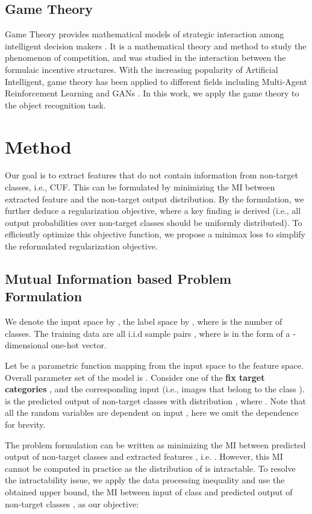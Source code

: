 \documentclass{article}
\theoremstyle{definition}
\begin{document}
\subsection{Game Theory}
Game Theory provides mathematical models of strategic interaction among intelligent decision makers \cite{myerson1991game}. It is a mathematical theory and method to study the phenomenon of competition, and was studied in \cite{osborne2004introduction} the interaction between the formulaic incentive structures. With the increasing popularity of Artificial Intelligent, game theory has been applied to different fields including Multi-Agent Reinforcement Learning \cite{bowling2000analysis} and GANs \cite{goodfellow2014generative, goodfellow2016nips}. In this work, we apply the game theory to the object recognition task.

\section{Method}
Our goal is to extract features that do not contain information from non-target classes, i.e., CUF. This can be formulated by minimizing the MI between extracted feature and the non-target output distribution. By the formulation, we further deduce a regularization objective, where a key finding is derived (i.e., all output probabilities over non-target classes should be uniformly distributed). To efficiently optimize this objective function, we propose a minimax loss to simplify the reformulated regularization objective. 

\subsection{Mutual Information based Problem Formulation}

 We denote the input space by , the label space by , where  is the number of classes. 
 The training data are all i.i.d sample pairs , where  is in the form of a -dimensional one-hot vector.

Let  be a parametric function mapping from the input space to the feature space. 
Overall parameter set of the model is . Consider one of the \textbf{fix target categories }, and the corresponding input  (i.e., images that belong to the class ).  is the predicted output of non-target classes with distribution , where . Note that all the random variables  are dependent on input , here we omit the dependence for brevity.

The problem formulation can be written as minimizing the MI between predicted output of non-target classes  and extracted features , i.e. . However, this MI cannot be computed in practice as the distribution of  is intractable. To resolve the intractability issue, we apply the data processing inequality \cite{information_theory} and use the obtained upper bound, the MI between input  of class  and predicted output of non-target classes , as our objective:
\end{document}
